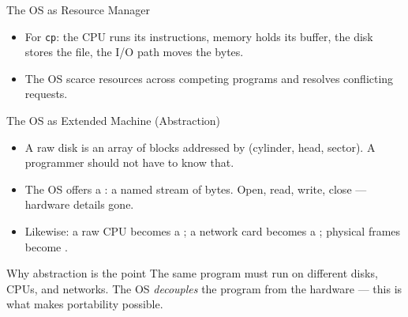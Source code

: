 \documentclass[aspectratio=169]{beamer}
\begin{document}
\begin{frame}{The OS as Resource Manager}
  \centering
  \vspace{0.25cm}
  \begin{itemize}
    \item For \texttt{cp}: the CPU runs its instructions, memory holds its
      buffer, the disk stores the file, the I/O path moves the bytes.
    \item The OS  scarce resources across competing programs
      and resolves conflicting requests.
  \end{itemize}
\end{frame}

\begin{frame}{The OS as Extended Machine (Abstraction)}
  \begin{itemize}
    \item A raw disk is an array of blocks addressed by (cylinder, head,
      sector). A programmer should not have to know that.
    \item The OS offers a : a named stream of bytes. Open, read,
      write, close --- hardware details gone.
    \item Likewise: a raw CPU becomes a ; a network card becomes a
      ; physical frames become .
  \end{itemize}
  \vspace{0.3cm}
  \begin{alertblock}{Why abstraction is the point}
    The same program must run on different disks, CPUs, and networks. The OS
    \emph{decouples} the program from the hardware --- this is what makes portability possible.
  \end{alertblock}
\end{frame}
\end{document}

